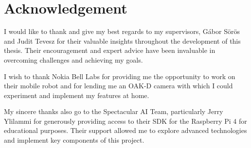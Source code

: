 \chapter{Acknowledgement} \label{acknowledgements}

I would like to thank and give my best regards to my supervisors, Gábor Sörös and Judit Tevesz for their valuable insights throughout the development of this thesis. Their encouragement and expert advice have been invaluable in overcoming challenges and achieving my goals.

I wish to thank Nokia Bell Labs for providing me the opportunity to work on their mobile robot and for lending me an OAK-D camera with which I could experiment and implement my features at home.

My sincere thanks also go to the Spectacular AI Team, particularly Jerry Ylilammi for generously providing access to their SDK for the Raspberry Pi 4 for educational purposes. Their support allowed me to explore advanced technologies and implement key components of this project.
